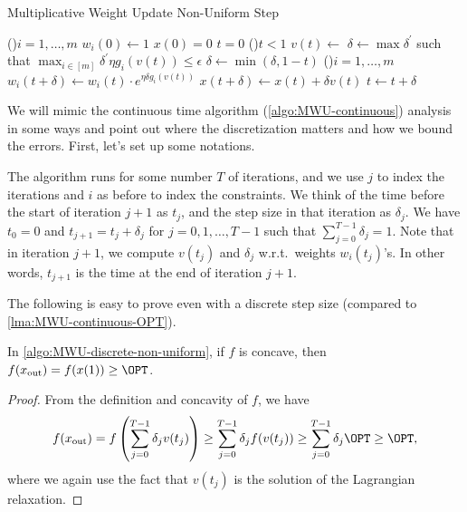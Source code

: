 \begin{algorithm}[H]\label{algo:MWU-discrete-non-uniform}
	\DontPrintSemicolon{}
	\caption{Multiplicative Weight Update Non-Uniform Step}
	\BlankLine

	\For(){\(i = 1, \dots , m\)}{
		\(w_i(0) \gets 1\)\;
	}
	\(x(0) = 0\)
	\(t = 0\)\;
	\;
	\While(){\(t < 1\)}{
	\(v(t) \gets\)\;
	\(\delta \gets \max \delta ^{\prime} \) such that \(\max _{i \in [m]} \delta ^{\prime} \eta g_i(v(t)) \leq \epsilon \)
	\(\delta \gets \min (\delta , 1 - t)\)
	\For(){\(i = 1, \dots , m\)}{
		\(w_i(t+\delta ) \gets w_i(t) \cdot e^{\eta \delta g_i(v (t))}\)\;
	}
	\(x (t+\delta ) \gets x (t) + \delta v (t)\)\;
	\(t \gets t + \delta \)\;
	}
	\;
\end{algorithm}

We will mimic the continuous time algorithm (\autoref{algo:MWU-continuous}) analysis in some ways and point out where the discretization matters and how we bound the errors. First, let's set up some notations.

\begin{notation}
	The algorithm runs for some number \(T\) of iterations, and we use \(j\) to index the iterations and \(i\) as before to index the constraints. We think of the time before the start of iteration \(j+1\) as \(t_j\), and the step size in that iteration as \(\delta _j\). We have \(t_0 = 0\) and \(t_{j+1} = t_j + \delta _j\) for \(j = 0, 1, \dots , T-1\) such that \(\sum_{j=0}^{T-1} \delta _j = 1\). Note that in iteration \(j+1\), we compute \(v(t_j)\) and \(\delta _j\) w.r.t.\ weights \(w_i(t_j)\)'s. In other words, \(t_{j+1}\) is the time at the end of iteration \(j+1\).
\end{notation}

The following is easy to prove even with a discrete step size (compared to \autoref{lma:MWU-continuous-OPT}).

\begin{lemma}\label{lma:MWU-discrete-non-uniform-OPT}
	In \autoref{algo:MWU-discrete-non-uniform}, if \(f\) is concave, then \(f(x _{\text{out} }) = f(x (1)) \geq \OPT\).
\end{lemma}
\begin{proof}
	From the definition and concavity of \(f\), we have
	\[
		f(x _{\text{out} })
		= f \left( \sum_{j=0}^{T-1} \delta _{j} v (t_j) \right)
		\geq \sum_{j=0}^{T-1} \delta _j f(v (t_j))
		\geq \sum_{j=0}^{T-1} \delta _j \OPT
		\geq \OPT,
	\]
	where we again use the fact that \(v(t_j)\) is the solution of the Lagrangian relaxation.
\end{proof}

